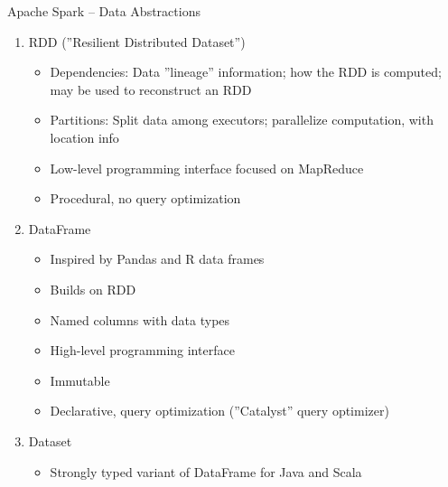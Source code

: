 \documentclass[ignorenonframetext,xcolor=x11names]{beamer}
\begin{document}
\begin{frame}[label=advanced]{Apache Spark -- Data Abstractions}
\small
\begin{enumerate}
  \item RDD (''Resilient Distributed Dataset'')
  \begin{itemize}
    \item Dependencies: Data ''lineage'' information; how the RDD is computed; may be used to reconstruct an RDD
    \item Partitions: Split data among executors; parallelize computation, with location info
    \item Low-level programming interface focused on MapReduce
    \item Procedural, no query optimization
  \end{itemize}
  \item DataFrame
  \begin{itemize}
     \item Inspired by Pandas and R data frames
     \item Builds on RDD
     \item Named columns with data types
     \item High-level programming interface
     \item Immutable
     \item Declarative, query optimization (''Catalyst'' query optimizer)
  \end{itemize}
  \item Dataset
  \begin{itemize}
     \item Strongly typed variant of DataFrame for Java and Scala
  \end{itemize}
\end{enumerate}
\end{frame}
\end{document}
